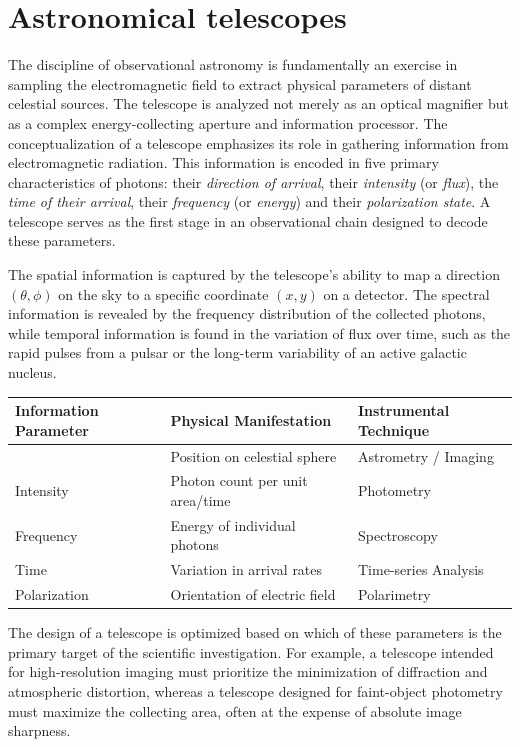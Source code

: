 \section{Astronomical telescopes}
The discipline of observational astronomy is fundamentally an exercise in sampling the electromagnetic field to extract physical parameters of distant celestial sources. The telescope is analyzed not merely as an optical magnifier but as a complex energy-collecting aperture and information processor. The conceptualization of a telescope emphasizes its role in gathering information from electromagnetic radiation. This information is encoded in five primary characteristics of photons: their \textit{direction of arrival}, their \textit{intensity} (or \textit{flux}), the \textit{time of their arrival}, their \textit{frequency} (or \textit{energy}) and their \textit{polarization state}. A telescope serves as the first stage in an observational chain designed to decode these parameters.

The spatial information is captured by the telescope's ability to map a direction $(\theta, \phi)$ on the sky to a specific coordinate $(x, y)$ on a detector. The spectral information is revealed by the frequency distribution of the collected photons, while temporal information is found in the variation of flux over time, such as the rapid pulses from a pulsar or the long-term variability of an active galactic nucleus.

\begin{table}[h!]
	\centering
	\begin{tabular}{|>{\raggedright\arraybackslash}p{}|>{\raggedright\arraybackslash}p{}|>{\raggedright\arraybackslash}p{}|}
		\hline
		\textbf{Information Parameter} & \textbf{Physical Manifestation} & \textbf{Instrumental Technique} \\ \hline
		{Direction} & {	Position on celestial sphere} & {Astrometry / Imaging} \\ \hline
		{Intensity} & {Photon count per unit area/time} & {Photometry} \\ \hline
		{Frequency} & {	Energy of individual photons} & {Spectroscopy} \\ \hline
		{Time} & {Variation in arrival rates} & {Time-series Analysis} \\ \hline
		{Polarization} & {Orientation of electric field} & {Polarimetry} \\ \hline
	\end{tabular}
\end{table}
The design of a telescope is optimized based on which of these parameters is the primary target of the scientific investigation. For example, a telescope intended for high-resolution imaging must prioritize the minimization of diffraction and atmospheric distortion, whereas a telescope designed for faint-object photometry must maximize the collecting area, often at the expense of absolute image sharpness.

